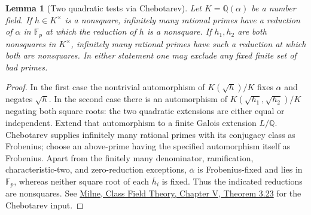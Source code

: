 \documentclass[11pt]{article}
\newtheorem{lemma}{Lemma}
\newcommand{\Q}{\mathbb Q}
\newcommand{\Fp}{\mathbb F_p}
\begin{document}
\begin{lemma}[Two quadratic tests via Chebotarev]\label{lem:cheb}
Let $K=\Q(\alpha)$ be a number field. If $h\in K^\times$ is a
nonsquare, infinitely many rational primes have a reduction of $\alpha$
in $\Fp$ at which the reduction of $h$ is a nonsquare. If $h_1,h_2$
are both nonsquares in $K^\times$, infinitely many rational primes
have such a reduction at which both are nonsquares. In either statement
one may exclude any fixed finite set of bad primes.
\end{lemma}
\begin{proof}
In the first case the nontrivial automorphism of $K(\sqrt h)/K$
fixes $\alpha$ and negates $\sqrt h$. In the second case there is an
automorphism of $K(\sqrt{h_1},\sqrt{h_2})/K$ negating both square
roots: the two quadratic extensions are either equal or independent.
Extend that automorphism to a finite Galois extension $L/\Q$.
Chebotarev supplies infinitely many rational primes with its conjugacy
class as Frobenius; choose an above-prime having the specified
automorphism itself as Frobenius. Apart from the finitely many
denominator, ramification, characteristic-two, and zero-reduction
exceptions, $\overline\alpha$ is Frobenius-fixed and lies in $\Fp$,
whereas neither square root of each $\overline h_i$ is fixed.
Thus the indicated reductions are nonsquares. See
\href{https://www.jmilne.org/math/CourseNotes/CFT.pdf}{Milne,
Class Field Theory, Chapter V, Theorem 3.23} for the Chebotarev input.
\end{proof}
\end{document}
